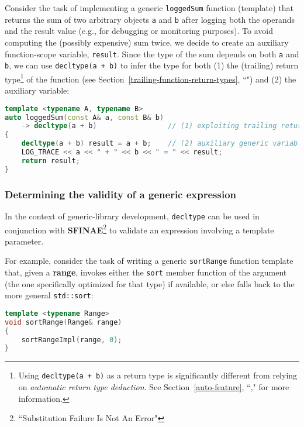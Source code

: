 Consider the task of implementing a generic \texttt{loggedSum} function
(template) that returns the sum of two arbitrary objects \texttt{a} and
\texttt{b} after logging both the operands and the result value (e.g.,
for debugging or monitoring purposes). To avoid computing the (possibly
expensive) sum twice, we decide to create an auxiliary function-scope
variable, \texttt{result}. Since the type of the sum depends on both
\texttt{a} and \texttt{b}, we can use
\texttt{decltype(a}~\texttt{+}~\texttt{b)} to infer the type for both
(1) the (trailing) return type{\cprotect\footnote{Using
\texttt{decltype(a}~\texttt{+}~\texttt{b)} as a return type is
significantly different from relying on \emph{automatic return type
  deduction}. See Section~\ref{auto-feature}, ``," for more information.}} of the
function (see Section~\ref{trailing-function-return-types}, ``") and (2) the auxiliary variable:

\begin{lstlisting}[language=C++]
template <typename A, typename B>
auto loggedSum(const A& a, const B& b)
    -> decltype(a + b)                 // (1) exploiting trailing return types
{
    decltype(a + b) result = a + b;    // (2) auxiliary generic variable
    LOG_TRACE << a << " + " << b << " = " << result;
    return result;
}
\end{lstlisting}
    

\subsubsection[Determining the validity of a generic expression]{Determining the validity of a generic expression}\label{determining-the-validity-of-a-generic-expression}

In the context of generic-library development, \texttt{decltype} can be
used in conjunction with \textbf{SFINAE}\footnote{``Substitution Failure Is Not An Error"} to validate an expression involving a
template parameter.

For example, consider the task of writing a generic \texttt{sortRange}
function template that, given a \textbf{range}, invokes either the
\texttt{sort} member function of the argument (the one specifically
optimized for that type) if available, or else falls back to the more
general \texttt{std::sort}:

\begin{lstlisting}[language=C++]
template <typename Range>
void sortRange(Range& range)
{
    sortRangeImpl(range, 0);
}
\end{lstlisting}
    
